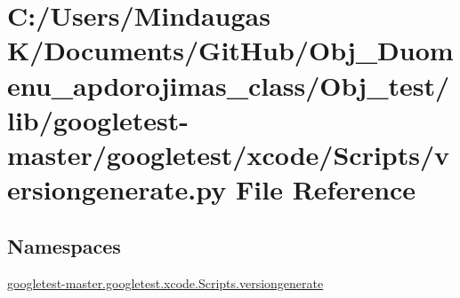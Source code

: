 \hypertarget{_obj__test_2lib_2googletest-master_2googletest_2xcode_2_scripts_2versiongenerate_8py}{}\section{C\+:/\+Users/\+Mindaugas K/\+Documents/\+Git\+Hub/\+Obj\+\_\+\+Duomenu\+\_\+apdorojimas\+\_\+class/\+Obj\+\_\+test/lib/googletest-\/master/googletest/xcode/\+Scripts/versiongenerate.py File Reference}
\label{_obj__test_2lib_2googletest-master_2googletest_2xcode_2_scripts_2versiongenerate_8py}
\subsection*{Namespaces}
\begin{DoxyCompactItemize}
\item 
 \mbox{\hyperlink{namespacegoogletest-master_1_1googletest_1_1xcode_1_1_scripts_1_1versiongenerate}{googletest-\/master.\+googletest.\+xcode.\+Scripts.\+versiongenerate}}
\end{DoxyCompactItemize}

